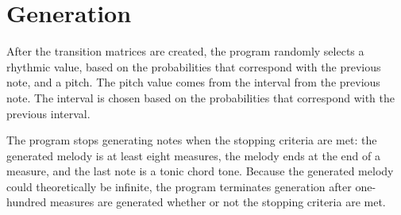\section{Generation}

After the transition matrices are created, the program randomly selects a rhythmic value, based on the probabilities that correspond with the previous note, and a pitch.
The pitch value comes from the interval from the previous note.
The interval is chosen based on the probabilities that correspond with the previous interval.

The program stops generating notes when the stopping criteria are met: the generated melody is at least eight measures, the melody ends at the end of a measure, and the last note is a tonic chord tone.
Because the generated melody could theoretically be infinite, the program terminates generation after one-hundred measures are generated whether or not the stopping criteria are met.
